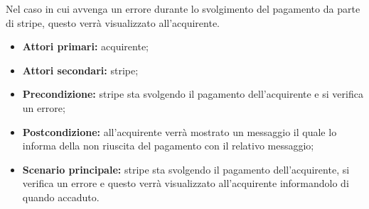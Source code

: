 Nel caso in cui avvenga un errore durante lo svolgimento del pagamento da parte di stripe, questo verrà visualizzato all'acquirente.
\begin{itemize}
	\item \textbf{Attori primari:} acquirente;
	\item \textbf{Attori secondari:} stripe;
	\item \textbf{Precondizione:} stripe sta svolgendo il pagamento dell'acquirente e si verifica un errore;
	\item \textbf{Postcondizione:} all'acquirente verrà mostrato un messaggio il quale lo informa della non riuscita del pagamento con il relativo messaggio;
	\item \textbf{Scenario principale:} stripe sta svolgendo il pagamento dell'acquirente, si verifica un errore e questo verrà visualizzato all'acquirente informandolo di quando accaduto.
\end{itemize}
